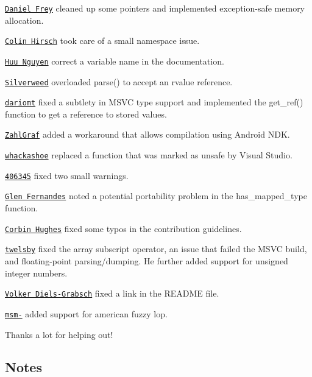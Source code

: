 \begin{DoxyItemize}
\item \href{https://github.com/d-frey}{\tt Daniel Frey} cleaned up some pointers and implemented exception-\/safe memory allocation.
\item \href{https://github.com/ColinH}{\tt Colin Hirsch} took care of a small namespace issue.
\item \href{https://github.com/whoshuu}{\tt Huu Nguyen} correct a variable name in the documentation.
\item \href{https://github.com/silverweed}{\tt Silverweed} overloaded {\ttfamily parse()} to accept an rvalue reference.
\item \href{https://github.com/dariomt}{\tt dariomt} fixed a subtlety in M\+S\+VC type support and implemented the {\ttfamily get\+\_\+ref()} function to get a reference to stored values.
\item \href{https://github.com/ZahlGraf}{\tt Zahl\+Graf} added a workaround that allows compilation using Android N\+DK.
\item \href{https://github.com/whackashoe}{\tt whackashoe} replaced a function that was marked as unsafe by Visual Studio.
\item \href{https://github.com/406345}{\tt 406345} fixed two small warnings.
\item \href{https://github.com/glenfe}{\tt Glen Fernandes} noted a potential portability problem in the {\ttfamily has\+\_\+mapped\+\_\+type} function.
\item \href{https://github.com/nibroc}{\tt Corbin Hughes} fixed some typos in the contribution guidelines.
\item \href{https://github.com/twelsby}{\tt twelsby} fixed the array subscript operator, an issue that failed the M\+S\+VC build, and floating-\/point parsing/dumping. He further added support for unsigned integer numbers.
\item \href{https://github.com/vog}{\tt Volker Diels-\/\+Grabsch} fixed a link in the R\+E\+A\+D\+ME file.
\item \href{https://github.com/msm-}{\tt msm-\/} added support for american fuzzy lop.
\end{DoxyItemize}

Thanks a lot for helping out!

\subsection*{Notes}


